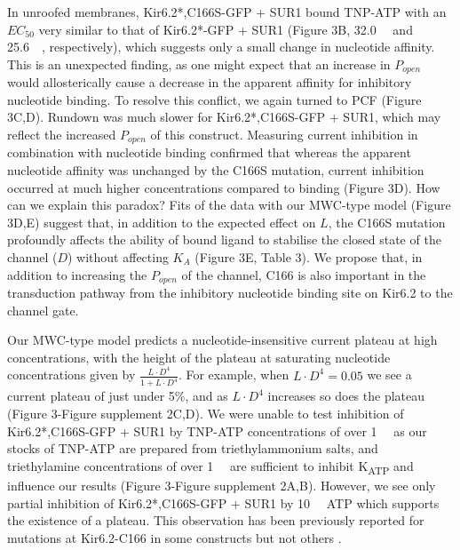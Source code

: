\documentclass[10pt,lineno, doublespacing]{elife}
\begin{document}
In unroofed membranes, Kir6.2*,C166S-GFP + SUR1 bound TNP-ATP with an $EC_{50}$ very similar to that of Kir6.2*-GFP + SUR1 (Figure 3B, \SI{32.0}{\micro\Molar} and \SI{25.6}{\micro\Molar}, respectively), which suggests only a small change in nucleotide affinity.
This is an unexpected finding, as one might expect that an increase in $P_{open}$ would allosterically cause a decrease in the apparent affinity for inhibitory nucleotide binding.
To resolve this conflict, we again turned to PCF (Figure 3C,D). Rundown was much slower for Kir6.2*,C166S-GFP + SUR1, which may reflect the increased $P_{open}$ of this construct.
Measuring current inhibition in combination with nucleotide binding confirmed that whereas the apparent nucleotide affinity was unchanged by the C166S mutation, current inhibition occurred at much higher concentrations compared to binding (Figure 3D).
How can we explain this paradox?
Fits of the data with our MWC-type model (Figure 3D,E) suggest that, in addition to the expected effect on $L$, the C166S mutation profoundly affects the ability of bound ligand to stabilise the closed state of the channel ($D$) without affecting $K_A$ (Figure 3E, Table 3).
We propose that, in addition to increasing the $P_{open}$ of the channel, C166 is also important in the transduction pathway from the inhibitory nucleotide binding site on Kir6.2 to the channel gate.

Our MWC-type model predicts a nucleotide-insensitive current plateau at high concentrations, with the height of the plateau at saturating nucleotide concentrations given by $\frac{L \cdot D^4}{1 + L \cdot D^4}$.
For example, when $L \cdot D^4 = 0.05$ we see a current plateau of just under 5\%, and as $L \cdot D^4$ increases so does the plateau (Figure 3-Figure supplement 2C,D).
We were unable to test inhibition of Kir6.2*,C166S-GFP + SUR1 by TNP-ATP concentrations of over \SI{1}{\milli\Molar} as our stocks of TNP-ATP are prepared from triethylammonium salts, and triethylamine concentrations of over \SI{1}{\milli\Molar} are sufficient to inhibit K\textsubscript{ATP} and influence our results (Figure 3-Figure supplement 2A,B).
However, we see only partial inhibition of Kir6.2*,C166S-GFP + SUR1 by \SI{10}{\milli\Molar} ATP which supports the existence of a plateau.
This observation has been previously reported for mutations at Kir6.2-C166 in some constructs \citep{RN92, RN117} but not others \citep{RN119}.
\end{document}

